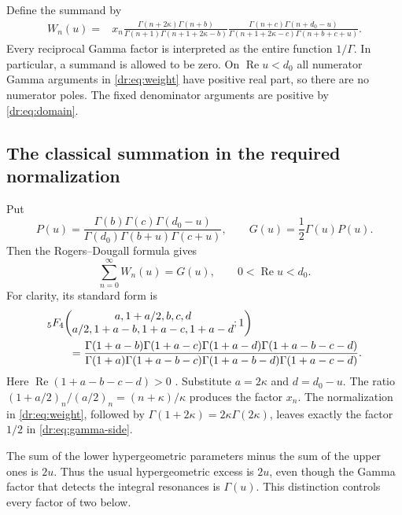 \documentclass[11pt,letterpaper]{article}
\numberwithin{equation}{section}
\theoremstyle{definition}
\theoremstyle{remark}
\DeclareMathOperator{\Rea}{Re}
\begin{document}
Define the summand by
\begin{align}
 W_n(u)={}&x_n
 \frac{\Gamma(n+2\kappa)\Gamma(n+b)}
 {\Gamma(n+1)\Gamma(n+1+2\kappa-b)}
 \frac{\Gamma(n+c)\Gamma(n+d_0-u)}
 {\Gamma(n+1+2\kappa-c)\Gamma(n+b+c+u)}.
 \label{dr:eq:weight}
\end{align}
Every reciprocal Gamma factor is interpreted as the entire function
$1/\Gamma$. In particular, a summand is allowed to be zero. On
$\Rea u<d_0$ all numerator Gamma arguments in \eqref{dr:eq:weight}
have positive real part, so there are no numerator poles. The fixed
denominator arguments are positive by \eqref{dr:eq:domain}.

\subsection{The classical summation in the required normalization}

Put
\begin{equation}
 P(u)=\frac{\Gamma(b)\Gamma(c)\Gamma(d_0-u)}
 {\Gamma(d_0)\Gamma(b+u)\Gamma(c+u)},
 \qquad G(u)=\frac12\Gamma(u)P(u).
 \label{dr:eq:gamma-side}
\end{equation}
Then the Rogers--Dougall formula gives
\begin{equation}
 \sum_{n=0}^{\infty}W_n(u)=G(u),
 \qquad 0<\Rea u<d_0.
 \label{dr:eq:dougall}
\end{equation}
For clarity, its standard form is
\begin{align}
 &{}_5F_4\!\left(\begin{matrix}a,1+a/2,b,c,d\\
 a/2,1+a-b,1+a-c,1+a-d\end{matrix};1\right)\notag\\
 &\qquad=
 \frac{\Gamma(1+a-b)\Gamma(1+a-c)\Gamma(1+a-d)
       \Gamma(1+a-b-c-d)}
 {\Gamma(1+a)\Gamma(1+a-b-c)\Gamma(1+a-b-d)
       \Gamma(1+a-c-d)}.
 \label{dr:eq:classical}
\end{align}
Here $\Rea(1+a-b-c-d)>0$ \cite{dlmf-dougall}. Substitute
$a=2\kappa$ and $d=d_0-u$. The ratio
$(1+a/2)_n/(a/2)_n=(n+\kappa)/\kappa$ produces the factor $x_n$.
The normalization in \eqref{dr:eq:weight}, followed by
$\Gamma(1+2\kappa)=2\kappa\Gamma(2\kappa)$, leaves exactly the factor
$1/2$ in \eqref{dr:eq:gamma-side}.

The sum of the lower hypergeometric parameters minus the sum of the upper
ones is $2u$. Thus the usual hypergeometric excess is $2u$, even though the
Gamma factor that detects the integral resonances is $\Gamma(u)$.
This distinction controls every factor of two below.
\end{document}

